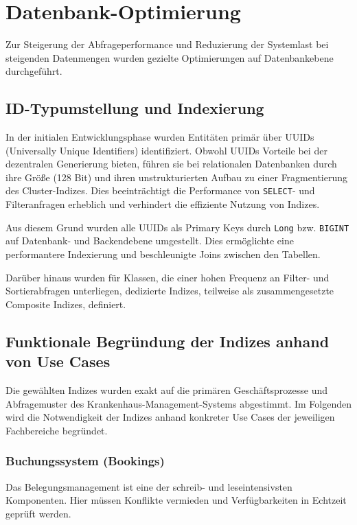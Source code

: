 \section{Datenbank-Optimierung}
Zur Steigerung der Abfrageperformance und Reduzierung der Systemlast bei steigenden Datenmengen wurden gezielte Optimierungen auf Datenbankebene durchgeführt. 

\subsection{ID-Typumstellung und Indexierung}
In der initialen Entwicklungsphase wurden Entitäten primär über UUIDs (Universally Unique Identifiers) identifiziert. 
Obwohl UUIDs Vorteile bei der dezentralen Generierung bieten, führen sie bei relationalen Datenbanken durch ihre Größe (128 Bit) und ihren unstrukturierten Aufbau zu einer Fragmentierung des Cluster-Indizes. 
Dies beeinträchtigt die Performance von \texttt{SELECT}- und Filteranfragen erheblich und verhindert die effiziente Nutzung von Indizes.

Aus diesem Grund wurden alle UUIDs als Primary Keys durch \texttt{Long} bzw. \texttt{BIGINT} auf Datenbank- und Backendebene umgestellt. Dies ermöglichte eine performantere Indexierung und beschleunigte Joins zwischen den Tabellen. 

Darüber hinaus wurden für Klassen, die einer hohen Frequenz an Filter- und Sortierabfragen unterliegen, dedizierte Indizes, teilweise als zusammengesetzte Composite Indizes, definiert.


\subsection{Funktionale Begründung der Indizes anhand von Use Cases}
Die gewählten Indizes wurden exakt auf die primären Geschäftsprozesse und Abfragemuster des Krankenhaus-Management-Systems abgestimmt. Im Folgenden wird die Notwendigkeit der Indizes anhand konkreter Use Cases der jeweiligen Fachbereiche begründet.

\subsubsection{Buchungssystem (Bookings)}
Das Belegungsmanagement ist eine der schreib- und leseintensivsten Komponenten. Hier müssen Konflikte vermieden und Verfügbarkeiten in Echtzeit geprüft werden.

